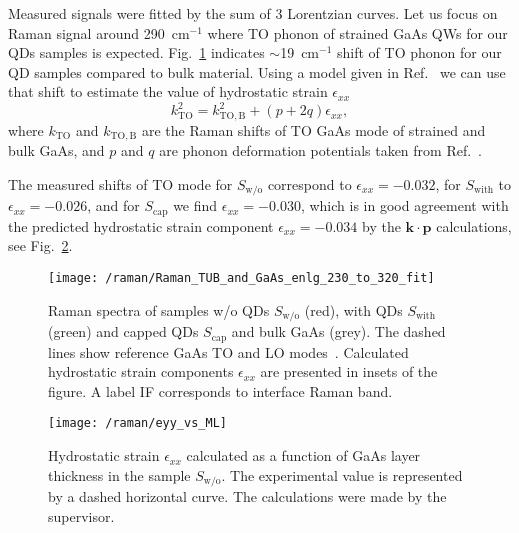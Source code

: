 Measured signals were fitted by the sum of 3 Lorentzian curves.
Let us focus on Raman signal around 290~cm$^{-1}$ where TO phonon of strained GaAs QWs for our QDs samples is expected. Fig.~\ref{fig:raman} indicates $\sim$19~cm$^{-1}$ shift of TO phonon for our QD samples compared to bulk material. Using a model given in Ref.~\cite{Montazeri_Nano2010} we can use that shift to estimate the value of hydrostatic strain $\epsilon_{xx}$ 
\begin{equation}
k_\mathrm{TO}^2 = k_\mathrm{TO,B}^2 + (p+2q)\epsilon_{xx},
\end{equation}
where $k_\mathrm{TO}$ and $k_\mathrm{TO,B}$ are the Raman shifts of TO GaAs mode of strained and bulk GaAs, and $p$ and $q$ are phonon deformation potentials taken from Ref.~\cite{Cerdeira_PRB1972}.

The measured shifts of TO mode for $S_\mathrm{w/o}$ correspond to $\epsilon_{xx}=-0.032$, for $S_\mathrm{with}$ to $\epsilon_{xx}=-0.026$,  and for $S_\mathrm{cap}$ we find $\epsilon_{xx}=-0.030$, which is in good agreement with the predicted hydrostatic strain component $\epsilon_{xx}=-0.034$ by the $\mathbf{k \cdot p}$ calculations, see Fig.~\ref{fig:raman_theory_wo}. %
\begin{figure}
	\centering
	\texttt{[image: /raman/Raman\_TUB\_and\_GaAs\_enlg\_230\_to\_320\_fit]}
	\caption{Raman spectra of samples w/o QDs $S_\mathrm{w/o}$ (red), with QDs $S_\mathrm{with}$ (green) and capped QDs $S_\mathrm{cap}$ and bulk GaAs (grey). The dashed lines show reference GaAs TO and LO modes~\citep{Esther_Nanotech2013}. Calculated hydrostatic strain components $\epsilon_{xx}$ are presented in insets of the figure. A label IF corresponds to interface Raman band.}
	\label{fig:raman}
\end{figure}

\begin{figure}
	\centering
	\texttt{[image: /raman/eyy\_vs\_ML]}
	\caption{Hydrostatic strain $\epsilon_{xx}$ calculated as a function of GaAs layer thickness in the sample $S_\mathrm{w/o}$. The experimental value is represented by a dashed horizontal curve. The calculations were made by the supervisor.}
	\label{fig:raman_theory_wo}
\end{figure}

{}
\clearpage
